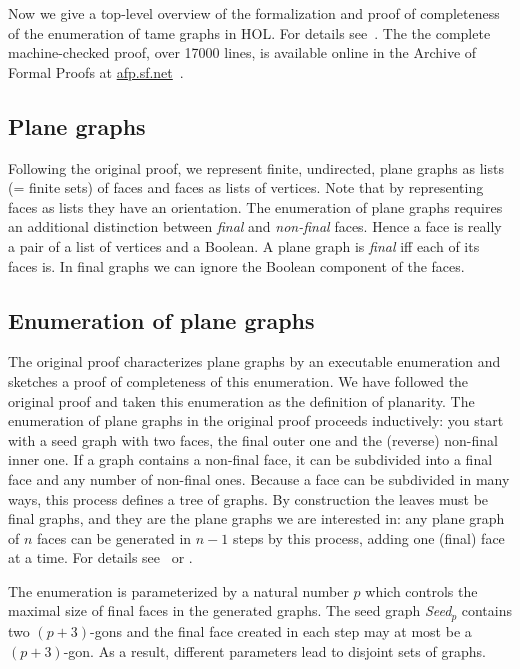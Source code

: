\documentclass[11pt]{amsart}
\begin{document}
Now we give a top-level overview of the formalization and proof of
completeness of the enumeration of tame graphs in HOL. For details
see~\cite{NipkowBS-IJCAR06}. The the complete machine-checked proof, over
17000 lines, is available online in the Archive of Formal Proofs at
\url{afp.sf.net}~\cite{BauerN-AFP06}.

\subsection*{Plane graphs}

Following the original proof, we represent finite, undirected, plane graphs as lists
(= finite sets) of faces and faces as lists of vertices. Note that by
representing faces as lists they have an orientation. The enumeration of
plane graphs requires an additional distinction between \emph{final}
and \emph{non-final} faces. Hence a face is really a pair of a list
of vertices and a Boolean.
A plane graph is \emph{final} iff each of its faces is.
In final graphs we can ignore the Boolean component of the faces.

\subsection*{Enumeration of plane graphs}

The original proof characterizes plane graphs by an executable enumeration and sketches a
proof of completeness of this enumeration. We have followed the original proof and taken
this enumeration as the definition of planarity.  The enumeration of plane
graphs in the original proof proceeds inductively: you start with a seed graph with two faces, the
final outer one and the (reverse) non-final inner one. If a graph contains a
non-final face, it can be subdivided into a final face and any number of
non-final ones.  Because a face can be subdivided in many ways, this process
defines a tree of graphs. By construction the leaves must be final graphs,
and they are the plane graphs we are interested in: any plane graph of $n$
faces can be generated in $n-1$ steps by this process, adding one (final)
face at a time. For details see~\cite{Hales:2006:DCG} or
\cite{NipkowBS-IJCAR06}.

The enumeration is parameterized by a natural number $p$ which controls the
maximal size of final faces in the generated graphs. The seed graph
\textit{Seed$_p$} contains two $(p+3)$-gons and the final
face created in each step may at most be a $(p+3)$-gon. As a result,
different parameters lead to disjoint sets of graphs.
\end{document}
